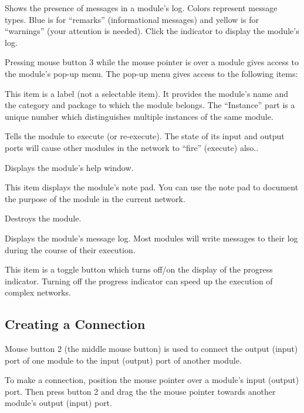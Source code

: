 \begin{description}
   Shows the presence of messages in a
  module's log.  Colors represent message types.  Blue is for
  ``remarks'' (informational messages) and yellow is for ``warnings''
  (your attention is needed).  Click the indicator to display the
  module's log.

 Pressing mouse button 3 while the mouse
  pointer is over a module gives access to the module's pop-up menu.  The
  pop-up menu gives access to the following items:
  \begin{description}
     This item is a
    label (not a selectable item).  It provides the module's name and
    the category and package to which the module belongs.  The
    ``Instance'' part is a unique number which distinguishes multiple
    instances of the same module.

     Tells the module to
    execute (or re-execute).  The state of its input and
    output ports will cause other modules in the network to
    ``fire'' (execute) also..

     Displays the module's help window.
    
     This item displays the module's note pad.
    You can use the note pad to document the purpose of the module in
    the current network.

     Destroys the module.
    
     Displays the module's message log.  Most
    modules will write messages to their log during the course of
    their execution.
    
     This item is a toggle button which
    turns off/on the display of the progress indicator.  Turning off
    the progress indicator can speed up the execution of complex
    networks.
  \end{description}
\end{description}


\subsection{Creating a Connection}
\label{sec:connectmods}

Mouse button 2 (the middle mouse button) is used to connect the output
(input) port of one module to the input (output) port of another
module.

To make a connection, position the mouse pointer over a module's input
(output) port.  Then press button 2 and drag the the mouse pointer towards
another module's output (input) port.

